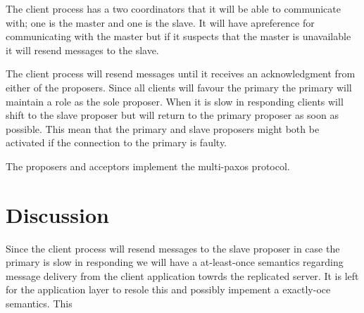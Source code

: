 \documentclass[a4paper,11pt]{article}
\newcommand{\nnsection}[1]{
\section*{#1}
\addcontentsline{toc}{section}{#1}
}
\begin{document}

The client process has a two coordinators that it will be able to
communicate with; one is the master and one is the slave. It will have
apreference for communicating with the master but if it suspects that
the master is unavailable it will resend messages to the slave.

The client process will resend messages until it receives an
acknowledgment from either of the proposers. Since all clients will
favour the primary the primary will maintain a role as the sole
proposer. When it is slow in responding clients will shift to the
slave proposer but will return to the primary proposer as soon as
possible. This mean that the primary and slave proposers might both be
activated if the connection to the primary is faulty. 


The proposers and acceptors implement the multi-paxos protocol.

\subsection{}
  
\nnsection{Discussion}


Since the client process will resend messages to the slave proposer in
case the primary is slow in responding we will have a at-least-once
semantics regarding message delivery from the client application
towrds the replicated server. It is left for the application layer to
resole this and possibly impement a exactly-oce semantics. This 
\end{document}
